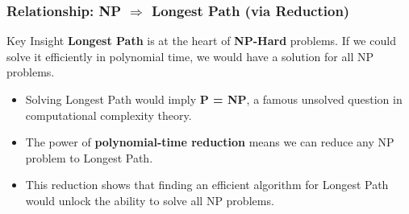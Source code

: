 \begin{frame}
    \frametitle{Relationship: NP $\Rightarrow$ Longest Path (via Reduction)}

    \begin{block}{Key Insight}
        \textbf{Longest Path} is at the heart of \textbf{NP-Hard} problems. 
        If we could solve it efficiently in polynomial time, we would have a solution for all NP problems.
    \end{block}

    \vspace{0.5em}

    \begin{itemize}
        \item Solving Longest Path would imply \textbf{P = NP}, a famous unsolved question in computational complexity theory.
        \item The power of \textbf{polynomial-time reduction} means we can reduce any NP problem to Longest Path.
        \item This reduction shows that finding an efficient algorithm for Longest Path would unlock the ability to solve all NP problems.
    \end{itemize}
\end{frame}


